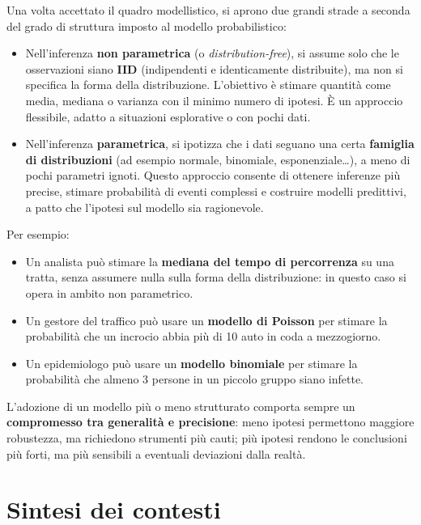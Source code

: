 \documentclass[
  11pt,
]{book}
\providecommand{\tightlist}{%
  \setlength{\itemsep}{0pt}\setlength{\parskip}{0pt}}
\theoremstyle{mytheoremstyle}
\theoremstyle{mydefstyle}
\begin{document}
Una volta accettato il quadro modellistico, si aprono due grandi strade a seconda del grado di struttura imposto al modello probabilistico:

\begin{itemize}
\item
  Nell'inferenza \textbf{non parametrica} (o \emph{distribution-free}), si assume solo che le osservazioni siano \textbf{IID} (indipendenti e identicamente distribuite), ma non si specifica la forma della distribuzione. L'obiettivo è stimare quantità come media, mediana o varianza con il minimo numero di ipotesi. È un approccio flessibile, adatto a situazioni esplorative o con pochi dati.
\item
  Nell'inferenza \textbf{parametrica}, si ipotizza che i dati seguano una certa \textbf{famiglia di distribuzioni} (ad esempio normale, binomiale, esponenziale\ldots), a meno di pochi parametri ignoti. Questo approccio consente di ottenere inferenze più precise, stimare probabilità di eventi complessi e costruire modelli predittivi, a patto che l'ipotesi sul modello sia ragionevole.
\end{itemize}

Per esempio:

\begin{itemize}
\tightlist
\item
  Un analista può stimare la \textbf{mediana del tempo di percorrenza} su una tratta, senza assumere nulla sulla forma della distribuzione: in questo caso si opera in ambito non parametrico.
\item
  Un gestore del traffico può usare un \textbf{modello di Poisson} per stimare la probabilità che un incrocio abbia più di 10 auto in coda a mezzogiorno.
\item
  Un epidemiologo può usare un \textbf{modello binomiale} per stimare la probabilità che almeno 3 persone in un piccolo gruppo siano infette.
\end{itemize}

L'adozione di un modello più o meno strutturato comporta sempre un \textbf{compromesso tra generalità e precisione}: meno ipotesi permettono maggiore robustezza, ma richiedono strumenti più cauti; più ipotesi rendono le conclusioni più forti, ma più sensibili a eventuali deviazioni dalla realtà.

\section{Sintesi dei contesti}\label{sintesi-dei-contesti}
\end{document}
